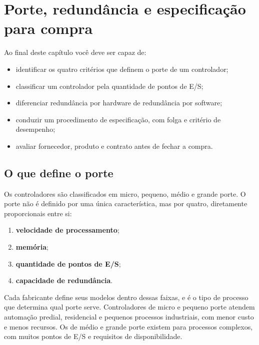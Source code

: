 \chapter{Porte, redundância e especificação para compra}
\label{cap:porte}

\begin{objetivos}
Ao final deste capítulo você deve ser capaz de:
\begin{itemize}
  \item identificar os quatro critérios que definem o porte de um controlador;
  \item classificar um controlador pela quantidade de pontos de E/S;
  \item diferenciar redundância por hardware de redundância por software;
  \item conduzir um procedimento de especificação, com folga e critério de desempenho;
  \item avaliar fornecedor, produto e contrato antes de fechar a compra.
\end{itemize}
\end{objetivos}

\section{O que define o porte}

Os controladores são classificados em micro, pequeno, médio e grande porte. O porte não é definido
por uma única característica, mas por quatro, diretamente proporcionais entre si:

\begin{enumerate}
  \item \textbf{velocidade de processamento};
  \item \textbf{memória};
  \item \textbf{quantidade de pontos de E/S};
  \item \textbf{capacidade de redundância}.
\end{enumerate}

Cada fabricante define seus modelos dentro dessas faixas, e é o tipo de processo que determina qual
porte serve. Controladores de micro e pequeno porte atendem automação predial, residencial e
pequenos processos industriais, com menor custo e menos recursos. Os de médio e grande porte existem
para processos complexos, com muitos pontos de E/S e requisitos de disponibilidade.


